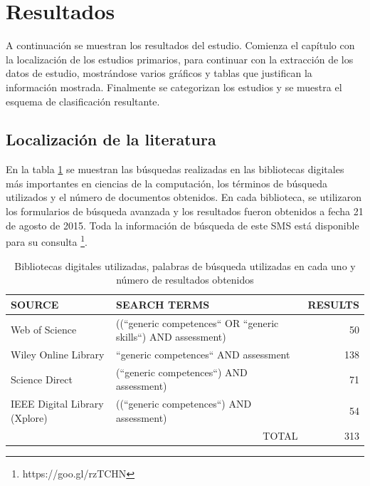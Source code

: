 \section{Resultados}

A continuación se muestran los resultados del estudio. Comienza el capítulo con la localización de los estudios primarios, para continuar con la extracción de los datos de estudio, mostrándose varios gráficos y tablas que justifican la información mostrada. Finalmente se categorizan los estudios y se muestra el esquema de clasificación resultante.

\subsection{Localización de la literatura}

En la tabla \ref{tab:ResumenBusquedaResultados} se muestran las búsquedas realizadas en las bibliotecas digitales más importantes en ciencias de la computación, los términos de búsqueda utilizados y el número de documentos obtenidos. En cada biblioteca, se utilizaron los formularios de búsqueda avanzada y los resultados fueron obtenidos a fecha 21 de agosto de 2015. Toda la información de búsqueda de este SMS está disponible para su consulta \footnote{https://goo.gl/rzTCHN}.


\begin{table}
  \begin{center}
  \begin{tabular}{| p{4cm} | p{8cm} | r |}
    \hline
    SOURCE & SEARCH TERMS & RESULTS\\
    \hline
    \hline
    Web of Science & ((``generic competences`` OR ``generic skills``) AND assessment) & 50 \\
    \hline
    Wiley Online Library & ``generic competences`` AND assessment &  138 \\
    \hline
    Science Direct & (``generic competences``) AND assessment) &  71 \\
    \hline
    IEEE Digital Library (Xplore) & ((``generic competences``) AND assessment) & 54 \\
    \hline
    \hline
    \multicolumn{2}{|r|}{TOTAL} & 313\\
    \hline
  \end{tabular}
\end{center}
\caption{Bibliotecas digitales utilizadas, palabras de búsqueda utilizadas en cada uno y número de resultados obtenidos}
\label{tab:ResumenBusquedaResultados}
\end{table} 

